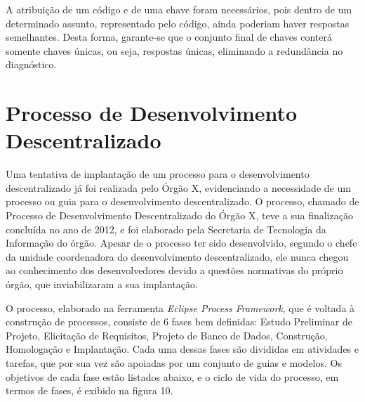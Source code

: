 A atribuição de um código e de uma chave foram necessários, pois dentro de um determinado assunto, representado pelo código, ainda poderiam haver respostas semelhantes. Desta forma, garante-se que o conjunto final de chaves conterá somente chaves únicas, ou seja, respostas únicas, eliminando a redundância no diagnóstico.
\clearpage

\section{Processo de Desenvolvimento Descentralizado}

Uma tentativa de implantação de um processo para o desenvolvimento descentralizado já foi realizada pelo Órgão X, evidenciando a necessidade de um processo ou guia para o desenvolvimento descentralizado. O processo, chamado de Processo de Desenvolvimento Descentralizado do Órgão X, teve a sua finalização concluída no ano de 2012, e foi elaborado pela Secretaria de Tecnologia da Informação do órgão. Apesar de o processo ter sido desenvolvido, segundo o chefe da unidade coordenadora do desenvolvimento descentralizado, ele nunca chegou ao conhecimento dos desenvolvedores devido a questões normativas do próprio órgão, que inviabilizaram a sua implantação.

O processo, elaborado na ferramenta \textit{Eclipse Process Framework}, que é voltada à construção de processos, consiste de 6 fases bem definidas: Estudo Preliminar de Projeto, Elicitação de Requisitos, Projeto de Banco de Dados, Construção, Homologação e Implantação. Cada uma dessas fases são divididas em atividades e tarefas, que por sua vez são apoiadas por um conjunto de guias e modelos. Os objetivos de cada fase estão listados abaixo, e o ciclo de vida do processo, em termos de fases, é exibido na figura 10.

